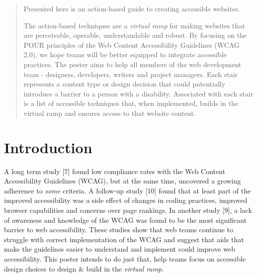 \documentclass{acm_proc_article-sp}
\begin{document}
\maketitle
\begin{abstract}
Presented here is an action-based guide to creating accessible websites.

The action-based techniques are a \textit{virtual ramp} for making websites that are perceivable, operable, understandable and robust. By focusing on the POUR principles of the Web Content Accessibility Guidelines (WCAG 2.0), we hope teams will be better equipped to integrate accessible practices. The poster aims to help all members of the web development team - designers, developers, writers and project managers. Each stair represents a content type or design decision that could potentially introduce a barrier to a person with a disability. Associated with each stair is a list of accessible techniques that, when implemented, builds in the virtual ramp and ensures access to that website content.

\end{abstract}



\section{Introduction}
A long term study [7] found low compliance rates with the Web Content Accessibility Guidelines (WCAG), but at the same time, uncovered a growing adherence to \textit{some} criteria. A follow-up study [10] found that at least part of the improved accessibility was a side effect of changes in coding practices, improved browser capabilities and concerns over page rankings. In another study [9], a lack of awareness and knowledge of the WCAG was found to be the most significant barrier to web accessibility. These studies show that web teams continue to struggle with correct implementation of the WCAG and suggest that aids that make the guidelines easier to understand and implement could improve web accessibility. This poster intends to do just that, help teams focus on accessible design choices to design \& build in the \textit{virtual ramp}. 
\end{document}
